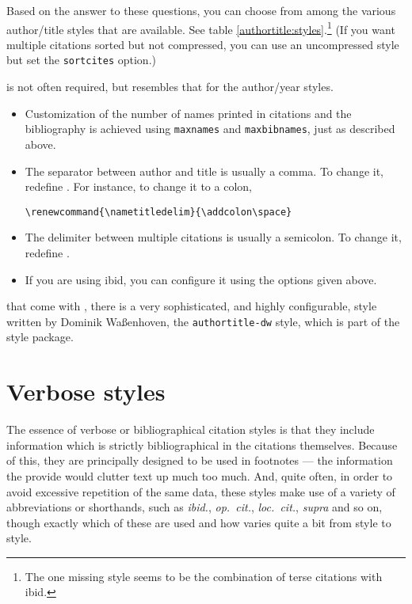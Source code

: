 Based on the answer to these questions, you can choose from among the
various author/title styles that are available. See table
\ref{authortitle:styles}.\footnote{The one missing style seems to be
  the combination of terse citations with ibid.} (If you want multiple
citations sorted but not compressed, you can use an uncompressed style
but set the \verb|sortcites| option.)

 is not often required, but resembles that
for the author/year styles.
\begin{itemize}
\item Customization of the number of names printed in citations and
  the bibliography is achieved using \verb|maxnames| and
  \verb|maxbibnames|, just as described above.
\item The separator between author and title is usually a comma. To
  change it, redefine . For instance, to change it
  to a colon,
\begin{verbatim}
\renewcommand{\nametitledelim}{\addcolon\space}
\end{verbatim}
\item The delimiter between multiple citations is usually a
  semicolon. To change it, redefine .
\item If you are using ibid, you
  can configure it using the options given above.
\end{itemize}

 that come with \biblatex,
there is a very sophisticated, and highly configurable, style written
by Dominik Waßenhoven, the \texttt{authortitle-dw} style, which is
part of the  style package.

\section{Verbose styles}

The essence of verbose or bibliographical citation styles is that they
include information which is strictly bibliographical in the citations
themselves. Because of this, they are principally designed to be used
in footnotes --- the information the provide would clutter text up
much too much. And, quite often, in order to avoid excessive
repetition of the same data, these styles make use of a variety of
abbreviations or shorthands, such as \emph{ibid.}, \emph{op.\ cit.},
\emph{loc.\ cit.}, \emph{supra} and so on, though exactly which of
these are used and how varies quite a bit from style to style.

